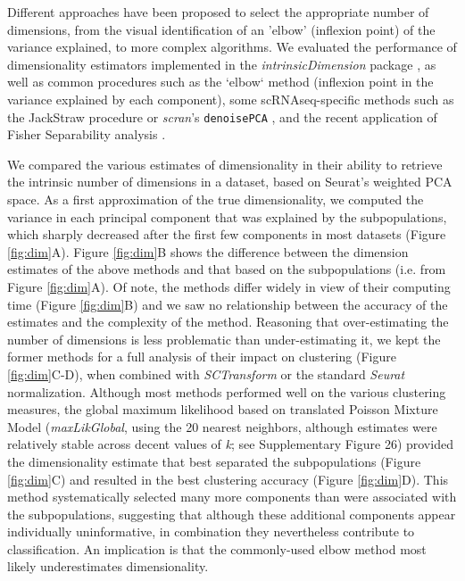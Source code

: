 \documentclass{bmcart}
\begin{document}
Different approaches have been proposed to select the appropriate number of dimensions, from the visual identification of an 'elbow' (inflexion point) of the variance explained, to more complex algorithms. We evaluated the performance of dimensionality estimators implemented in the \textit{intrinsicDimension} package \cite{johnssonDimensionality2015}, as well as common procedures such as the `elbow` method (inflexion point in the variance explained by each component), some scRNAseq-specific methods such as the JackStraw procedure \cite{ChungJackstraw2015} or \textit{scran}'s \texttt{denoisePCA} \cite{LunScran2016}, and the recent application of Fisher Separability analysis \cite{AlberganteSepar2019}.

We compared the various estimates of dimensionality in their ability to retrieve the intrinsic number of dimensions in a dataset, based on Seurat's weighted PCA space. As a first approximation of the true dimensionality, we computed the variance in each principal component that was explained by the subpopulations, which sharply decreased after the first few components in most datasets (Figure \ref{fig:dim}A). Figure \ref{fig:dim}B shows the difference between the dimension estimates of the above methods and that based on the subpopulations (i.e. from Figure \ref{fig:dim}A). Of note, the methods differ widely in view of their computing time (Figure \ref{fig:dim}B) and we saw no relationship between the accuracy of the estimates and the complexity of the method. Reasoning that over-estimating the number of dimensions is less problematic than under-estimating it, we kept the former methods for a full analysis of their impact on clustering (Figure \ref{fig:dim}C-D), when combined with \textit{SCTransform} or the standard \textit{Seurat} normalization. Although most methods performed well on the various clustering measures, the global maximum likelihood based on translated Poisson Mixture Model (\textit{maxLikGlobal}, using the 20 nearest neighbors, although estimates were relatively stable across decent values of \textit{k}; see Supplementary Figure 26) provided the dimensionality estimate that best separated the subpopulations (Figure \ref{fig:dim}C) and resulted in the best clustering accuracy (Figure \ref{fig:dim}D). This method systematically selected many more components than were associated with the subpopulations, suggesting that although these additional components appear individually uninformative, in combination they nevertheless contribute to classification. An implication is that the commonly-used elbow method most likely underestimates dimensionality.
\end{document}
